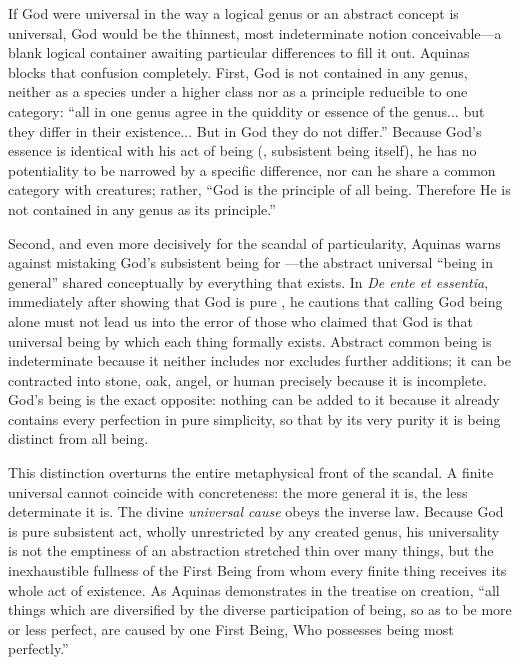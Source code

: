 If God were universal in the way a logical genus or an abstract concept is universal, God would be the thinnest, most indeterminate notion conceivable---a blank logical container awaiting particular differences to fill it out. Aquinas blocks that confusion completely. First, God is not contained in any genus, neither as a species under a higher class nor as a principle reducible to one category: ``all in one genus agree in the quiddity or essence of the genus... but they differ in their existence... But in God they do not differ.'' Because God's essence is identical with his act of being (, subsistent being itself), he has no potentiality to be narrowed by a specific difference, nor can he share a common category with creatures; rather, ``God is the principle of all being. Therefore He is not contained in any genus as its principle.''

Second, and even more decisively for the scandal of particularity, Aquinas warns against mistaking God's subsistent being for ---the abstract universal ``being in general'' shared conceptually by everything that exists. In \textit{De ente et essentia}, immediately after showing that God is pure , he cautions that calling God being alone must not lead us into the error of those who claimed that God is that universal being by which each thing formally exists. Abstract common being is indeterminate because it neither includes nor excludes further additions; it can be contracted into stone, oak, angel, or human precisely because it is incomplete. God's being is the exact opposite: nothing can be added to it because it already contains every perfection in pure simplicity, so that by its very purity it is being distinct from all being.

This distinction overturns the entire metaphysical front of the scandal. A finite universal cannot coincide with concreteness: the more general it is, the less determinate it is. The divine \textit{universal cause} obeys the inverse law. Because God is pure subsistent act, wholly unrestricted by any created genus, his universality is not the emptiness of an abstraction stretched thin over many things, but the inexhaustible fullness of the First Being from whom every finite thing receives its whole act of existence. As Aquinas demonstrates in the treatise on creation, ``all things which are diversified by the diverse participation of being, so as to be more or less perfect, are caused by one First Being, Who possesses being most perfectly.''

